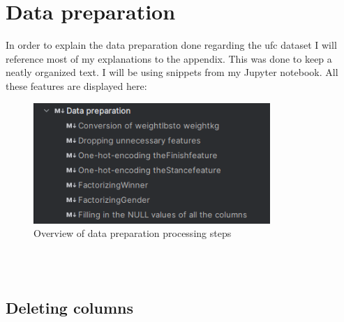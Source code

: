\documentclass{article}
\begin{document}
 \section{Data preparation}
  In order to explain the data preparation done regarding the ufc dataset I will reference most of my explanations to the appendix. This was done to keep a neatly organized
  text. I will be using snippets from my Jupyter notebook. All these features are displayed here: \\
  \begin{figure}
    \centering
    \includegraphics[width=0.8\textwidth]{images/ToC_Data_cleaning.png}
    \caption{Overview of data preparation processing steps}
  \end{figure}\\\\

  \subsection{Deleting columns}
 
\end{document}
